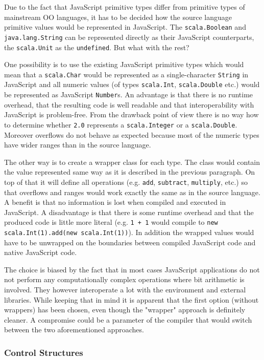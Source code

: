 \documentclass[12pt,a4paper]{report}
\begin{document}
Due to the fact that JavaScript primitive types differ from primitive types of mainstream OO languages, it has to be decided how the source language primitive values  would be represented in JavaScript. The \texttt{scala.Boolean} and \texttt{java.lang.String} can be represented directly as their JavaScript counterparts, the \texttt{scala.Unit} as the \texttt{undefined}. But what with the rest? 

One possibility is to use the existing JavaScript primitive types which would mean that a \texttt{scala.Char} would be represented as a single-character \texttt{String} in JavaScript and all numeric values (of types \texttt{scala.Int}, \texttt{scala.Double} etc.) would be represented as JavaScript \texttt{Number}s. An advantage is that there is no runtime overhead, that the resulting code is well readable and that interoperability with JavaScript is problem-free. From the drawback point of view there is no way how to determine whether \texttt{2.0} represents a \texttt{scala.Integer} or a \texttt{scala.Double}. Moreover overflows do not behave as expected because most of the numeric types have wider ranges than in the source language.

The other way is to create a wrapper class for each type. The class would contain the value represented same way as it is described in the previous paragraph. On top of that it will define all operations (e.g. \texttt{add}, \texttt{subtract}, \texttt{multiply}, etc.) so that overflows and ranges would work exactly the same as in the source language. A benefit is that no information is lost when compiled and executed in JavaScript. A disadvantage is that there is some runtime overhead and that the produced code is little more literal (e.g. \texttt{1 + 1} would compile to \texttt{new scala.Int(1).add(new scala.Int(1))}). In addition the wrapped values would have to be unwrapped on the boundaries between compiled JavaScript code and native JavaScript code. 

The choice is biased by the fact that in most cases JavaScript applications do not not perform any computationally complex operations where bit arithmetic is involved. They however interoperate a lot with the environment and external libraries. While keeping that in mind it is apparent that the first option (without wrappers) has been chosen, even though the "wrapper" approach is definitely cleaner. A compromise could be a parameter of the compiler that would switch between the two aforementioned approaches.

\subsubsection*{Control Structures}
\end{document}
